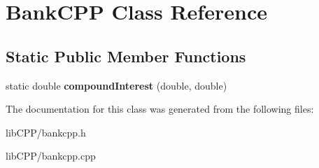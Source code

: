 \hypertarget{classBankCPP}{\section{Bank\-C\-P\-P Class Reference}
\label{classBankCPP}
}
\subsection*{Static Public Member Functions}
\begin{DoxyCompactItemize}
\item 
\hypertarget{classBankCPP_a27ce8653b4fe637389cedf8a44dd7828}{static double {\bfseries compound\-Interest} (double, double)}\label{classBankCPP_a27ce8653b4fe637389cedf8a44dd7828}

\end{DoxyCompactItemize}


The documentation for this class was generated from the following files\-:\begin{DoxyCompactItemize}
\item 
lib\-C\-P\-P/bankcpp.\-h\item 
lib\-C\-P\-P/bankcpp.\-cpp\end{DoxyCompactItemize}
